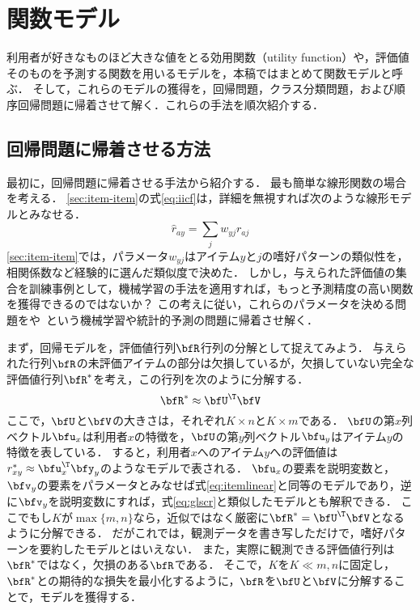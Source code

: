 \section{関数モデル}
\label{sec:funcmodel}

利用者が好きなものほど大きな値をとる効用関数（utility function）や，評価値そのものを予測する関数を用いるモデルを，本稿ではまとめて関数モデルと呼ぶ．
そして，これらのモデルの獲得を，回帰問題，クラス分類問題，および順序回帰問題に帰着させて解く．これらの手法を順次紹介する．

\subsection{回帰問題に帰着させる方法}

最初に，回帰問題に帰着させる手法から紹介する．
最も簡単な線形関数の場合を考える．
\ref{sec:item-item}の式\eqref{eq:iicf}は，詳細を無視すれば次のような線形モデルとみなせる．
\begin{equation}
\hat{r}_{ay} = \sum_j w_{yj} r_{aj}
\label{eq:itemlinear}
\end{equation}
\ref{sec:item-item}では，パラメータ$w_{yj}$はアイテム$y$と$j$の嗜好パターンの類似性を，相関係数など経験的に選んだ類似度で決めた．
しかし，与えられた評価値の集合を訓練事例として，機械学習の手法を適用すれば，もっと予測精度の高い関数を獲得できるのではないか？
この考えに従い，これらのパラメータを決める問題をや~\cite{eb:053:00,jpublist:077x}という機械学習や統計的予測の問題に帰着させ解く．

まず，回帰モデルを，評価値行列$\bfR$行列の分解として捉えてみよう．
与えられた行列$\bfR$の未評価アイテムの部分は欠損しているが，欠損していない完全な評価値行列$\bfR^\ast$を考え，この行列を次のように分解する．
\begin{equation}
\bfR^\ast\approx \bfU^\T\bfV
\label{eq:factormodel}
\end{equation}
ここで，$\bfU$と$\bfV$の大きさは，それぞれ$K\times n$と$K\times m$である．
$\bfU$の第$x$列ベクトル$\bfu_x$は利用者$x$の特徴を，$\bfU$の第$y$列ベクトル$\bfu_y$はアイテム$y$の特徴を表している．
すると，利用者$x$へのアイテム$y$への評価値は$r^\ast_{xy}\approx\bfu_x^\T\bfy_y$のようなモデルで表される．
$\bfu_x$の要素を説明変数と，$\bfv_y$の要素をパラメータとみなせば式\eqref{eq:itemlinear}と同等のモデルであり，逆に$\bfv_y$を説明変数にすれば，式\eqref{eq:glscr}と類似したモデルとも解釈できる．
ここでもし$K$が$\max\{m,n\}$なら，近似ではなく厳密に$\bfR^{\ast}=\bfU^\T\bfV$となるように分解できる．
だがこれでは，観測データを書き写しただけで，嗜好パターンを要約したモデルとはいえない．
また，実際に観測できる評価値行列は$\bfR^\ast$ではなく，欠損のある$\bfR$である．
そこで，$K$を$K\ll m,n$に固定し，$\bfR^\ast$との期待的な損失を最小化するように，$\bfR$を$\bfU$と$\bfV$に分解することで，モデルを獲得する．

